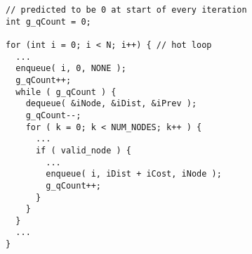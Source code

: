 \begin{lstlisting}[morekeywords={g_qCount},belowskip=0pt]
// predicted to be 0 at start of every iteration
int g_qCount = 0;

for (int i = 0; i < N; i++) { // hot loop
  ...
  enqueue( i, 0, NONE );
  g_qCount++;
  while ( g_qCount ) {
    dequeue( &iNode, &iDist, &iPrev );
    g_qCount--;
    for ( k = 0; k < NUM_NODES; k++ ) {
      ...
      if ( valid_node ) {
        ...
        enqueue( i, iDist + iCost, iNode );
        g_qCount++;
      }
    }
  }
  ...
}

\end{lstlisting}
